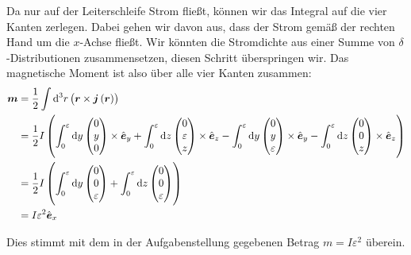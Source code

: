 \documentclass[11pt, ngerman, fleqn]{article}
\newcommand{\ev}{\hat{\vec e}}
\newcommand{\half}{\frac 12}
\renewcommand{\vec}[1]{\boldsymbol{#1}}
\begin{document}
Da nur auf der Leiterschleife Strom fließt, können wir das Integral auf die
vier Kanten zerlegen. Dabei gehen wir davon aus, dass der Strom gemäß der
rechten Hand um die $x$-Achse fließt. Wir könnten die Stromdichte aus einer
Summe von $\delta$-Distributionen zusammensetzen, diesen Schritt überspringen
wir. Das magnetische Moment ist also über alle vier Kanten zusammen:
\begin{align*}
	\vec m
	&= \half \int \dif{^3 r} \del{\vec r \times \vec j\del{\vec r}} \\
	&= \half I \del{
	\int_0^\varepsilon \dif y
	\begin{pmatrix}
		0 \\ y \\ 0
	\end{pmatrix}
	\times
	\ev_y
	+
	\int_0^\varepsilon \dif z
	\begin{pmatrix}
		0 \\ \varepsilon \\ z
	\end{pmatrix}
	\times
	\ev_z
	-
	\int_0^\varepsilon \dif y
	\begin{pmatrix}
		0 \\ y \\ \varepsilon
	\end{pmatrix}
	\times
	\ev_y
	-
	\int_0^\varepsilon \dif z
	\begin{pmatrix}
		0 \\ 0 \\ z
	\end{pmatrix}
	\times
	\ev_z
} \\
	&= \half I \del{
	\int_0^\varepsilon \dif y
	\begin{pmatrix}
		0 \\ 0 \\ \varepsilon
	\end{pmatrix}
	+
	\int_0^\varepsilon \dif z
	\begin{pmatrix}
		0 \\ 0 \\ \varepsilon
	\end{pmatrix}
} \\
&= I \varepsilon^2 \ev_x
\end{align*}

Dies stimmt mit dem in der Aufgabenstellung gegebenen Betrag $m = I \varepsilon^2$
überein.
\end{document}
